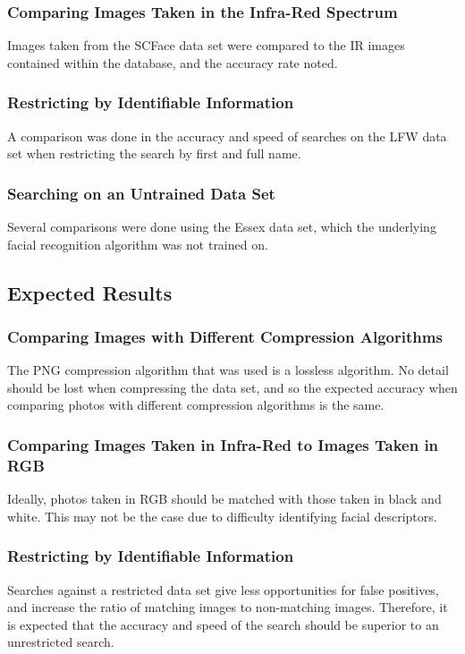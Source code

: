 \documentclass[12pt]{article}
\begin{document}
\subsubsection{Comparing Images Taken in the Infra-Red Spectrum}
Images taken from the SCFace data set were compared to the IR images contained within the database, and the accuracy rate noted.

\subsubsection{Restricting by Identifiable Information}
A comparison was done in the accuracy and speed of searches on the LFW data set when restricting the search by first and full name.

\subsubsection{Searching on an Untrained Data Set}
Several comparisons were done using the Essex data set, which the underlying facial recognition algorithm was not trained on.

\subsection{Expected Results}
\subsubsection{Comparing Images with Different Compression Algorithms}
The PNG compression algorithm that was used is a lossless algorithm. No detail should be lost when compressing the data set, and so the expected accuracy when comparing photos with different compression algorithms is the same.

\subsubsection{Comparing Images Taken in Infra-Red to Images Taken in RGB}
Ideally, photos taken in RGB should be matched with those taken in black and white. This may not be the case due to difficulty identifying facial descriptors.

\subsubsection{Restricting by Identifiable Information}
Searches against a restricted data set give less opportunities for false positives, and increase the ratio of matching images to non-matching images. Therefore, it is expected that the accuracy and speed of the search should be superior to an unrestricted search.
\end{document}
